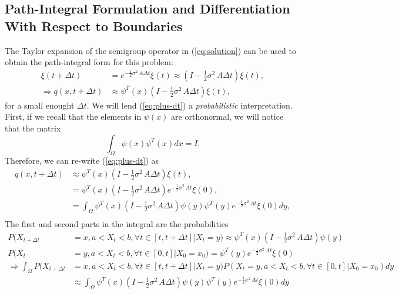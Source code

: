 \documentclass[10pt]{article}
\begin{document}
\subsection{Path-Integral Formulation and Differentiation With Respect
  to Boundaries}
The Taylor expansion of the semigroup operator in (\ref{eq:solution})
can be used to obtain the path-integral form for this problem:
\begin{align}
  \xi(t+\Delta t) &= e^{-\frac{1}{2}\sigma^2\, A\Delta t}\xi(t) \approx \left(I - \frac{1}{2}\sigma^2\, A \Delta t \right) \xi(t), \nonumber \\
  \Rightarrow q(x,t+\Delta t) &\approx \psi^T(x) \left(I - \frac{1}{2}\sigma^2\, A \Delta t \right) \xi(t), \label{eq:plus-dt}
\end{align}
for a small enought $\Delta t$. We will lend (\ref{eq:plus-dt}) a
\textit{probabilistic} interpretation. First, if we recall that the
elements in $\psi(x)$ are orthonormal, we will notice that the matrix
\[
  \displaystyle \int_\Omega \psi(x)\psi^T(x) dx = I.
\]
Therefore, we can re-write (\ref{eq:plus-dt}) as
\begin{align*}
  q(x,t+\Delta t) &\approx \psi^T(x) \left(I - \frac{1}{2}\sigma^2\, A \Delta t \right) \xi(t), \\
                  &= \psi^T(x) \left(I - \frac{1}{2}\sigma^2\, A \Delta t \right) e^{-\frac{1}{2}\sigma^2\, A t} \xi(0), \\
                  &= \displaystyle \int_\Omega \psi^T(x)
                    \left(I - \frac{1}{2}\sigma^2\, A \Delta t \right) \psi(y) \psi^T(y)
                    e^{-\frac{1}{2}\sigma^2\, A t} \xi(0) dy, \\
\end{align*}
The first and second parts in the integral are the probabilities
\begin{align*}
  P(X_{t+\Delta t} &= x, a < X_t < b, \forall t \in [t,t+\Delta t] |
                     X_t = y) \approx \psi^T(x) \left(I - \frac{1}{2}\sigma^2\, A \Delta
                     t \right) \psi(y) \\
  P(X_t &= y, a < X_t < b, \forall t \in [0,t] | X_0 = x_0) = \psi^T(y) e^{-\frac{1}{2}\sigma^2\, A t} \xi(0) \\
  \Rightarrow \displaystyle \int_\Omega P(X_{t+\Delta t} &= x, a < X_t < b, \forall t \in [t,t+\Delta t] |
                                                           X_t = y) P(X_t = y, a < X_t < b,
                                                           \forall t \in [0,t] | X_0 = x_0) dy \\
                   &\approx \displaystyle \int_\Omega \psi^T(x)
                    \left(I - \frac{1}{2}\sigma^2\, A \Delta t \right) \psi(y) \psi^T(y)
                    e^{-\frac{1}{2}\sigma^2\, A t} \xi(0) dy
\end{align*}
\end{document}

